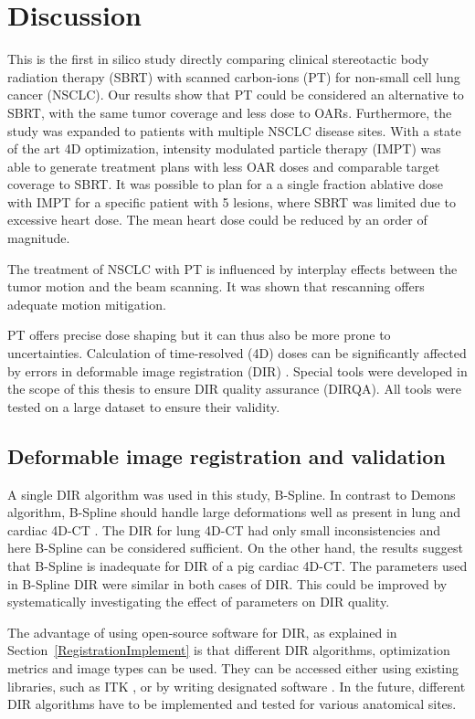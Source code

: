 \chapter{Discussion}

This is the first in silico study directly comparing clinical stereotactic body radiation therapy (SBRT) with scanned carbon-ions (PT) for non-small cell lung cancer (NSCLC). 
Our results show that PT could be considered an alternative to SBRT, with the same tumor coverage and less dose to OARs. Furthermore, the study was expanded to patients with multiple
NSCLC disease sites. With a state of the art 4D optimization, intensity modulated particle therapy (IMPT) was able to generate treatment plans with less OAR doses and comparable target coverage
to SBRT. It was possible to plan for a a single fraction ablative dose with IMPT for a specific patient with 5 lesions, where SBRT was limited due to excessive heart dose. The mean heart
dose could be reduced by an order of magnitude.

The treatment of NSCLC with PT is influenced by interplay effects between the tumor motion and the beam scanning. It was shown that rescanning offers
adequate motion mitigation. 

PT offers precise dose shaping but it can thus also be more prone to uncertainties. Calculation of time-resolved (4D) doses can be significantly
affected by errors in deformable image registration (DIR) \cite{Heath2006}. Special tools were developed in the scope of this thesis to ensure DIR quality assurance (DIRQA).
All tools were tested on a large dataset to ensure their validity.


\section{Deformable image registration and validation}

A single DIR algorithm was used in this study, B-Spline. In contrast to Demons algorithm, B-Spline should handle large deformations well as present in lung and cardiac 4D-CT \cite{Tang2013}.
The DIR for lung 4D-CT had only small inconsistencies and here B-Spline can be considered sufficient. On the other hand, the results suggest that B-Spline is inadequate for
DIR of a pig cardiac 4D-CT. The parameters used
in B-Spline DIR were similar in both cases of DIR. This could be improved by systematically investigating the effect of parameters on DIR quality. 

The advantage of using open-source software for DIR, as explained in Section~\ref{RegistrationImplement} is that different DIR algorithms, 
optimization metrics and image types can be used. They can be accessed either using
existing libraries, such as ITK \cite{Yoo2002}, or by writing designated software \cite{Fedorov2015}. In the future, different DIR algorithms have to be implemented 
and tested for various anatomical sites.

